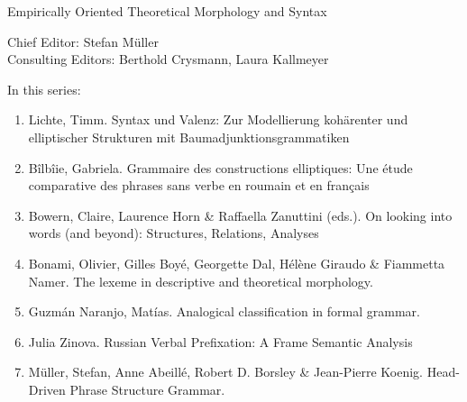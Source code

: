 {\large Em­pir­i­cal­ly Ori­ent­ed The­o­ret­i­cal Mor­phol­o­gy and Syn­tax}

\bigskip

Chief Editor: Stefan Müller \\
Consulting Editors: Berthold Crysmann, Laura Kallmeyer

\bigskip

In this series:

\begin{enumerate}
\item Lichte, Timm. Syntax und Valenz: Zur Modellierung kohärenter und elliptischer Strukturen mit Baumadjunktionsgrammatiken 
\item Bîlbîie, Gabriela. Grammaire des constructions elliptiques: Une étude comparative des phrases sans verbe en roumain et en français 
\item Bowern, Claire, Laurence Horn \& Raffaella Zanuttini (eds.). On looking into words (and beyond): Structures, Relations, Analyses
\item Bonami, Olivier, Gilles Boyé, Georgette Dal, Hélène Giraudo \& Fiammetta Namer. The lexeme in
  descriptive and theoretical morphology.
\item Guzmán Naranjo, Matías. Analogical classification in formal grammar.
\item Julia Zinova. Russian Verbal Prefixation: A Frame Semantic Analysis
\item Müller, Stefan, Anne Abeillé, Robert D. Borsley \& Jean-Pierre Koenig. Head-Driven Phrase Structure Grammar.
\end{enumerate}
